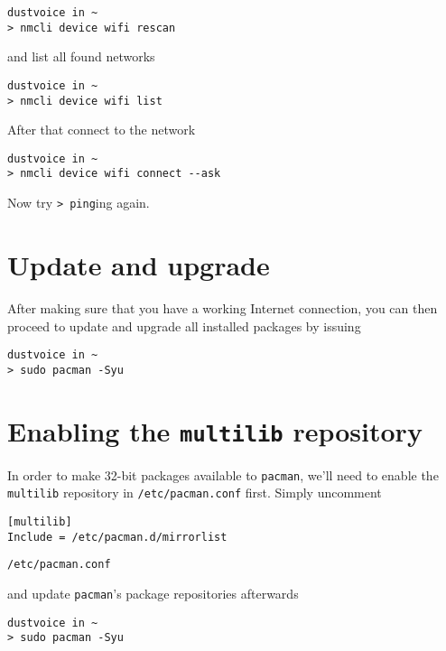 \documentclass[10pt]{dustdoc}
\begin{document}
\begin{verbatim}
dustvoice in ~
> nmcli device wifi rescan
\end{verbatim}

\noindent
and list all found networks

\begin{verbatim}
dustvoice in ~
> nmcli device wifi list
\end{verbatim}

After that connect to the network

\begin{verbatim}
dustvoice in ~
> nmcli device wifi connect --ask
\end{verbatim}

Now try \texttt{> ping}ing again.

\section{Update and upgrade}%
\label{sec:update-and-upgrade}

After making sure that you have a working Internet connection, you can then proceed to update and upgrade all installed packages by issuing

\begin{verbatim}
dustvoice in ~
> sudo pacman -Syu
\end{verbatim}

\section{Enabling the \texttt{multilib} repository}%
\label{sec:enabling-the-multilib-repository}

In order to make 32-bit packages available to \texttt{pacman}, we’ll need to enable the \texttt{multilib} repository in \texttt{/etc/pacman.conf} first.
Simply uncomment

\begin{mintedlisting}
    \begin{verbatim}
[multilib]
Include = /etc/pacman.d/mirrorlist
    \end{verbatim}

    \caption{\texttt{/etc/pacman.conf}}
\end{mintedlisting}

\noindent
and update \texttt{pacman}'s package repositories afterwards

\begin{verbatim}
dustvoice in ~
> sudo pacman -Syu
\end{verbatim}
\end{document}
